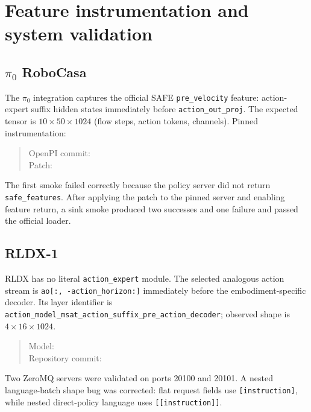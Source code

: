 \documentclass[11pt,a4paper]{article}
\newcommand{\code}[1]{\texttt{#1}}
\begin{document}
\section{Feature instrumentation and system validation}

\subsection{\texorpdfstring{$\pi_0$}{pi0} RoboCasa}
The $\pi_0$ integration captures the official SAFE \code{pre\_velocity} feature: action-expert suffix hidden states immediately before \code{action\_out\_proj}. The expected tensor is $10\times50\times1024$ (flow steps, action tokens, channels). Pinned instrumentation:
\begin{quote}\small
OpenPI commit: \\
Patch: 
\end{quote}

The first smoke failed correctly because the policy server did not return \code{safe\_features}. After applying the patch to the pinned server and enabling feature return, a sink smoke produced two successes and one failure and passed the official loader.

\subsection{RLDX-1}
RLDX has no literal \code{action\_expert} module. The selected analogous action stream is \code{ao[:, -action\_horizon:]} immediately before the embodiment-specific decoder. Its layer identifier is \code{action\_model\_msat\_action\_suffix\_pre\_action\_decoder}; observed shape is $4\times16\times1024$.
\begin{quote}\small
Model: \\
Repository commit: 
\end{quote}

Two ZeroMQ servers were validated on ports 20100 and 20101. A nested language-batch shape bug was corrected: flat request fields use \code{[instruction]}, while nested direct-policy language uses \code{[[instruction]]}.
\end{document}
